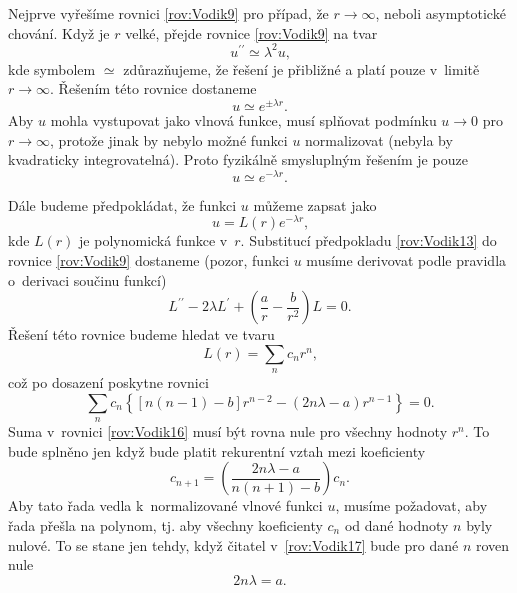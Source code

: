 Nejprve vyřešíme rovnici \eqref{rov:Vodik9} pro případ, že $r \rightarrow \infty$, neboli asymptotické chování. Když je $r$ velké, přejde rovnice \eqref{rov:Vodik9} na tvar
\begin{equation}
u^{\prime\prime} \simeq \lambda^2 u \mbox{,}
\label{rov:Vodik10}
\end{equation}
kde symbolem $\simeq$ zdůrazňujeme, že řešení je přibližné a platí pouze v~limitě $r \rightarrow \infty$. Řešením této rovnice dostaneme
\begin{equation}
u\simeq e^{\pm \lambda r} \mbox{.}
\label{rov:Vodik11}
\end{equation}
Aby $u$ mohla vystupovat jako vlnová funkce, musí splňovat podmínku $u \rightarrow 0$ pro $r \rightarrow \infty$, protože jinak by nebylo možné funkci $u$ normalizovat (nebyla by kvadraticky integrovatelná). Proto fyzikálně smysluplným řešením je pouze
\begin{equation}
u\simeq e^{- \lambda r} \mbox{.}
\label{rov:Vodik12}
\end{equation}

Dále budeme předpokládat, že funkci $u$ můžeme zapsat jako
\begin{equation}
u = L(r) e^{-\lambda r} \mbox{,}
\label{rov:Vodik13}
\end{equation}
kde $L(r)$ je polynomická funkce v~$r$. Substitucí předpokladu \eqref{rov:Vodik13} do rovnice \eqref{rov:Vodik9} dostaneme (pozor, funkci $u$ musíme derivovat podle pravidla o~derivaci součinu funkcí)
\begin{equation}
L^{\prime\prime} -2\lambda L^{\prime} + \left( \frac{a}{r} - \frac{b}{r^2} \right) L =0 \mbox{.}
\label{rov:Vodik14}
\end{equation}
Řešení této rovnice budeme hledat ve tvaru
\begin{equation}
L(r) = \sum_n c_n r^n \mbox{,}
\label{rov:Vodik15}
\end{equation}
což po dosazení poskytne rovnici
\begin{equation}
\sum_n c_n \left\lbrace [n(n-1) - b]r^{n-2} - (2n\lambda - a)r^{n-1} \right\rbrace = 0 \mbox{.}
\label{rov:Vodik16} 
\end{equation}
Suma v~rovnici \eqref{rov:Vodik16} musí být rovna nule pro všechny hodnoty $r^n$. To bude splněno jen když bude platit rekurentní vztah mezi koeficienty
\begin{equation}
c_{n+1} = \left(\frac{2n\lambda - a}{n(n+1) - b}\right) c_n \mbox{.}
\label{rov:Vodik17}
\end{equation}
Aby tato řada vedla k~normalizované vlnové funkci $u$, musíme požadovat, aby řada přešla na polynom, tj. aby všechny koeficienty $c_n$ od dané hodnoty $n$ byly nulové. To se stane jen tehdy, když čitatel v~\eqref{rov:Vodik17} bude pro dané $n$ roven nule
\begin{equation}
2n\lambda = a \mbox{.}
\label{rov:Vodik18}
\end{equation}

